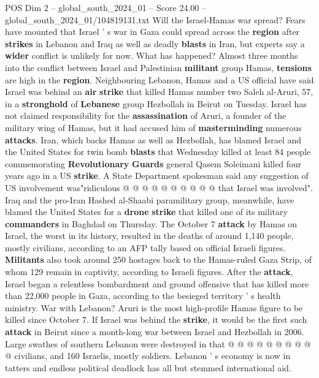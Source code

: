 \begin{textsample}{POS Dim 2 – global\_south\_2024\_01 – Score 24.00 – global\_south\_2024\_01/104819131.txt}  \label{ex:f2_pos_096}
Will the Israel-Hamas war spread?
Fears have mounted that Israel ' s war in Gaza could spread across the \textbf{region} after \textbf{strikes} in Lebanon and Iraq as well as deadly \textbf{blasts} in Iran, but experts say a \textbf{wider} conflict is unlikely for now.
What has happened?
Almost three months into the conflict between Israel and Palestinian \textbf{militant} group Hamas, \textbf{tensions} are high in the \textbf{region}.
Neighbouring Lebanon, Hamas and a US official have said Israel was behind an \textbf{air} \textbf{strike} that killed Hamas number two Saleh al-Aruri, 57, in a \textbf{stronghold} of \textbf{Lebanese} group Hezbollah in Beirut on Tuesday.
Israel has not claimed responsibility for the \textbf{assassination} of Aruri, a founder of the military wing of Hamas, but it had accused him of \textbf{masterminding} numerous \textbf{attacks}.
Iran, which backs Hamas as well as Hezbollah, has blamed Israel and the United States for twin bomb \textbf{blasts} that Wednesday killed at least 84 people commemorating \textbf{Revolutionary} \textbf{Guards} general Qasem Soleimani killed four years ago in a US \textbf{strike}.
A State Department spokesman said any suggestion of US involvement was"ridiculous @ @ @ @ @ @ @ @ @ @ that Israel was involved".
Iraq and the pro-Iran Hashed al-Shaabi paramilitary group, meanwhile, have blamed the United States for a \textbf{drone} \textbf{strike} that killed one of its military \textbf{commanders} in Baghdad on Thursday.
The October 7 \textbf{attack} by Hamas on Israel, the worst in its history, resulted in the deaths of around 1,140 people, mostly civilians, according to an AFP tally based on official Israeli figures. \textbf{Militants} also took around 250 hostages back to the Hamas-ruled Gaza Strip, of whom 129 remain in captivity, according to Israeli figures.
After the \textbf{attack}, Israel began a relentless bombardment and ground offensive that has killed more than 22,000 people in Gaza, according to the besieged territory ' s health ministry.
War with Lebanon?
Aruri is the most high-profile Hamas figure to be killed since October 7.
If Israel was behind the \textbf{strike}, it would be the first such \textbf{attack} in Beirut since a month-long war between Israel and Hezbollah in 2006.
Large swathes of southern Lebanon were destroyed in that @ @ @ @ @ @ @ @ @ @ civilians, and 160 Israelis, mostly soldiers.
Lebanon ' s economy is now in tatters and endless political deadlock has all but stemmed international aid.

\end{textsample}
